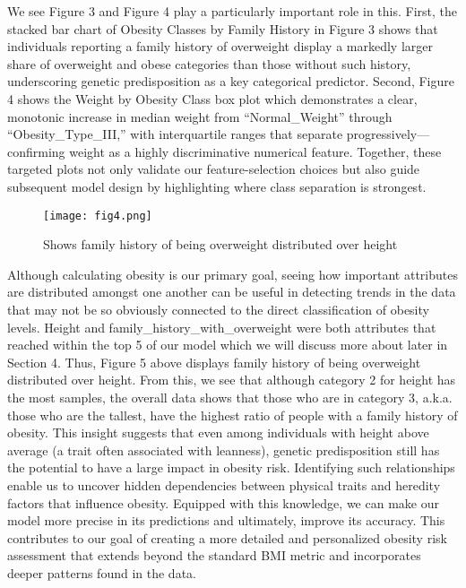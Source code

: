 \documentclass[conference]{IEEEtran}
\begin{document}
We see Figure 3 and Figure 4 play a particularly important role in this. First, the stacked bar chart of Obesity Classes by Family History in Figure 3 shows that individuals reporting a family history of overweight display a markedly larger share of overweight and obese categories than those without such history, underscoring genetic predisposition as a key categorical predictor. Second, Figure 4 shows the Weight by Obesity Class box plot which demonstrates a clear, monotonic increase in median weight from ``Normal\_Weight'' through ``Obesity\_Type\_III,'' with interquartile ranges that separate progressively—confirming weight as a highly discriminative numerical feature. Together, these targeted plots not only validate our feature-selection choices but also guide subsequent model design by highlighting where class separation is strongest.

\begin{figure}[htbp]
\centering
\texttt{[image: fig4.png]}
\caption{Shows family history of being overweight distributed over height }
\label{Table 3.1}
\end{figure}

Although calculating obesity is our primary goal, seeing how important attributes are distributed amongst one another can be useful in detecting trends in the data that may not be so obviously connected to the direct classification of obesity levels. Height and family\_history\_with\_overweight were both attributes that reached within the top 5 of our model which we will discuss more about later in Section 4. Thus, Figure 5 above displays family history of being overweight distributed over height. From this, we see that although category 2 for height has the most samples, the overall data shows that those who are in category 3, a.k.a. those who are the tallest, have the highest ratio of people with a family history of obesity. This insight suggests that even among individuals with height above average (a trait often associated with leanness), genetic predisposition still has the potential to have a large impact in obesity risk. Identifying such relationships enable us to uncover hidden dependencies between physical traits and heredity factors that influence obesity. Equipped with this knowledge, we can make our model more precise in its predictions and ultimately, improve its accuracy. This contributes to our goal of creating a more detailed and personalized obesity risk assessment that extends beyond the standard BMI metric and incorporates deeper patterns found in the data. 
\end{document}
